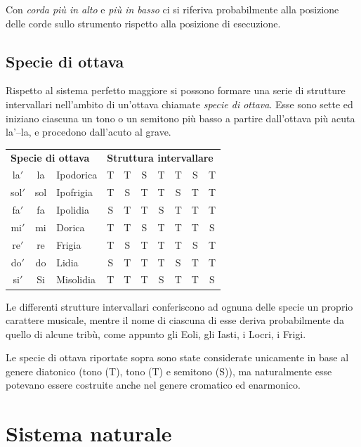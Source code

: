 Con \emph{corda più in alto} e \emph{più in basso} ci si riferiva
probabilmente alla posizione delle corde sullo strumento rispetto alla
posizione di esecuzione.

\newpage

\subsection{Specie di ottava}

Rispetto al sistema perfetto maggiore si possono formare una serie di
strutture intervallari nell'ambito di un'ottava chiamate \emph{specie di
ottava}. Esse sono sette ed iniziano ciascuna un tono o un semitono più basso
a partire dall'ottava più acuta la'--la, e procedono dall'acuto al grave.

\begin{center}\small
\begin{tabular}{c c l @{\qquad\qquad} *{7}{c}}
  \multicolumn{3}{l}{\textbf{Specie di ottava}}
    & \multicolumn{7}{l}{\textbf{Struttura intervallare}} \\[4pt]
  la$'$ & la & Ipodorica  & T & T & S & T & T & S & T \\
  sol$'$ & sol & Ipofrigia & T & S & T & T & S & T & T \\
  fa$'$ & fa & Ipolidia   & S & T & T & S & T & T & T \\
  mi$'$ & mi & Dorica     & T & T & S & T & T & T & S \\
  re$'$ & re & Frigia     & T & S & T & T & T & S & T \\
  do$'$ & do & Lidia      & S & T & T & T & S & T & T \\
  si$'$ & Si & Misolidia  & T & T & T & S & T & T & S \\
\end{tabular}
\end{center}

Le differenti strutture intervallari conferiscono ad ognuna delle specie un
proprio carattere musicale, mentre il nome di ciascuna di esse deriva
probabilmente da quello di alcune tribù, come appunto gli Eoli, gli Iasti, i
Locri, i Frigi.

Le specie di ottava riportate sopra sono state considerate unicamente in base
al genere diatonico (tono (T), tono (T) e semitono (S)), ma naturalmente esse
potevano essere costruite anche nel genere cromatico ed enarmonico.

\section{Sistema naturale}

